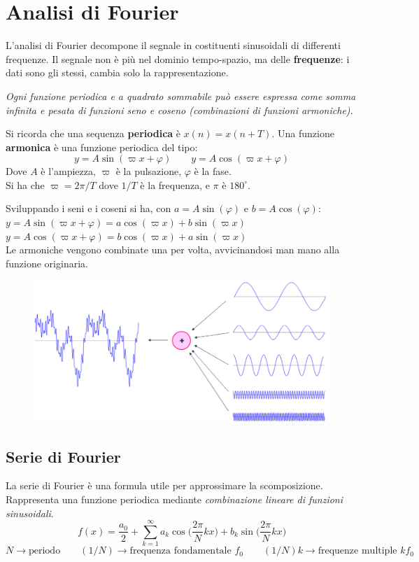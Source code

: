 \section{Analisi di Fourier}
L'analisi di Fourier decompone il segnale in costituenti sinusoidali di differenti frequenze. Il segnale non è più nel dominio tempo-spazio, ma delle \textbf{frequenze}: i dati sono gli stessi, cambia solo la rappresentazione.

\textit{Ogni funzione periodica e a quadrato sommabile può essere espressa come somma infinita e pesata di funzioni seno e coseno (combinazioni di funzioni armoniche).}

Si ricorda che una sequenza \textbf{periodica} è $x(n) = x(n + T)$. Una funzione \textbf{armonica} è una funzione periodica del tipo:
$$y = A\sin(\varpi x + \varphi) \qquad y = A\cos(\varpi x + \varphi)$$
Dove $A$ è l'ampiezza, $\varpi$ è la pulsazione, $\varphi$ è la fase. \\
Si ha che $\varpi = 2\pi/T$ dove $1/T$ è la frequenza, e $\pi$ è $180^{\circ}$.

Sviluppando i seni e i coseni si ha, con $a = A\sin(\varphi)$ e $b = A\cos(\varphi)$: \\
$y = A\sin(\varpi x + \varphi) = a\cos (\varpi x) + b\sin(\varpi x)$ \\
$y = A\cos(\varpi x + \varphi) = b\cos(\varpi x) + a\sin(\varpi x)$ \\

Le armoniche vengono combinate una per volta, avvicinandosi man mano alla funzione originaria.
\begin{figure}[h]
	\centering
	\includegraphics[scale=0.43]{Lezioni/Immagini/fourier}
\end{figure}

\subsection{Serie di Fourier}
La serie di Fourier è una formula utile per approssimare la scomposizione. Rappresenta una funzione periodica mediante \textit{combinazione lineare di funzioni sinusoidali}.
$$f(x) = \frac{a_0}{2} + \sum_{k=1}^{\infty} a_k \cos\Big(\frac{2\pi}{N}kx\Big) + b_k\sin\Big(\frac{2\pi}{N}kx\Big)$$
$$N \rightarrow \text{periodo} \qquad (1/N) \rightarrow \text{frequenza fondamentale } f_0 \qquad (1/N)k \rightarrow \text{frequenze multiple } kf_0$$

